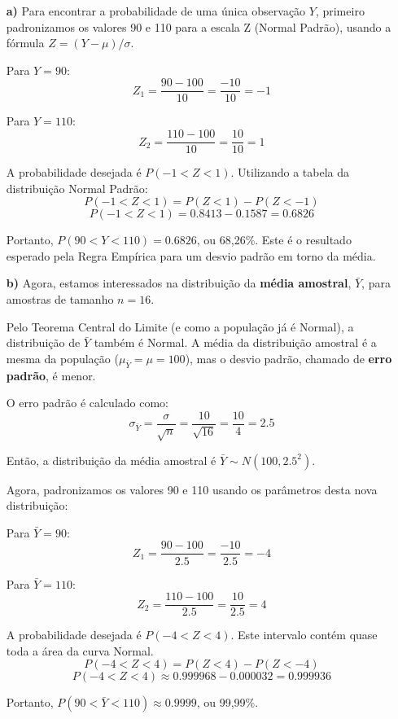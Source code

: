 \documentclass[12pt, a4paper]{article}
\begin{document}
\begin{itemize}
    \item[\textbf{a)}] Para encontrar a probabilidade de uma única observação $Y$, primeiro padronizamos os valores 90 e 110 para a escala Z (Normal Padrão), usando a fórmula $Z = (Y - \mu) / \sigma$.
    
    Para $Y = 90$:
    $$ Z_1 = \frac{90 - 100}{10} = \frac{-10}{10} = -1 $$
    
    Para $Y = 110$:
    $$ Z_2 = \frac{110 - 100}{10} = \frac{10}{10} = 1 $$
    
    A probabilidade desejada é $P(-1 < Z < 1)$. Utilizando a tabela da distribuição Normal Padrão:
    $$ P(-1 < Z < 1) = P(Z < 1) - P(Z < -1) $$
    $$ P(-1 < Z < 1) = 0.8413 - 0.1587 = 0.6826 $$
    
    Portanto, $P(90 < Y < 110) = 0.6826$, ou 68,26\%. Este é o resultado esperado pela Regra Empírica para um desvio padrão em torno da média.
    
    \item[\textbf{b)}] Agora, estamos interessados na distribuição da \textbf{média amostral}, $\bar{Y}$, para amostras de tamanho $n=16$.
    
    Pelo Teorema Central do Limite (e como a população já é Normal), a distribuição de $\bar{Y}$ também é Normal. A média da distribuição amostral é a mesma da população ($\mu_{\bar{Y}} = \mu = 100$), mas o desvio padrão, chamado de \textbf{erro padrão}, é menor.
    
    O erro padrão é calculado como:
    $$ \sigma_{\bar{Y}} = \frac{\sigma}{\sqrt{n}} = \frac{10}{\sqrt{16}} = \frac{10}{4} = 2.5 $$
    
    Então, a distribuição da média amostral é $\bar{Y} \sim N(100, 2.5^2)$.
    
    Agora, padronizamos os valores 90 e 110 usando os parâmetros desta nova distribuição:
    
    Para $\bar{Y} = 90$:
    $$ Z_1 = \frac{90 - 100}{2.5} = \frac{-10}{2.5} = -4 $$
    
    Para $\bar{Y} = 110$:
    $$ Z_2 = \frac{110 - 100}{2.5} = \frac{10}{2.5} = 4 $$
    
    A probabilidade desejada é $P(-4 < Z < 4)$. Este intervalo contém quase toda a área da curva Normal.
    $$ P(-4 < Z < 4) = P(Z < 4) - P(Z < -4) $$
    $$ P(-4 < Z < 4) \approx 0.999968 - 0.000032 = 0.999936 $$
    
    Portanto, $P(90 < \bar{Y} < 110) \approx 0.9999$, ou 99,99\%.
\end{itemize}
\end{document}
